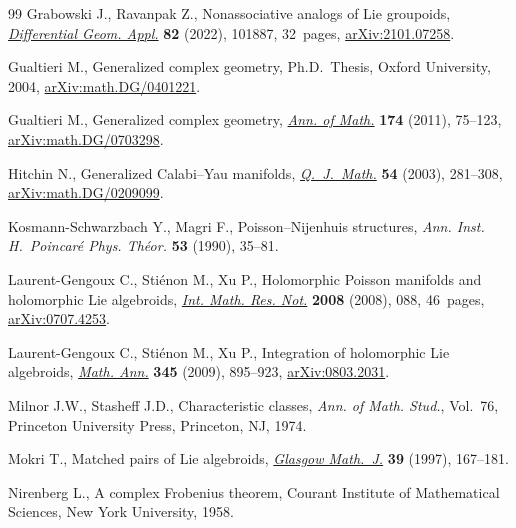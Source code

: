 \documentclass[pdftex]{sigma}
\numberwithin{equation}{section}
\begin{document}
\begin{thebibliography}{99}
Grabowski J., Ravanpak Z., Nonassociative analogs of {L}ie groupoids,
 \href{https://doi.org/10.1016/j.difgeo.2022.101887}{\textit{Differential
 Geom. Appl.}} \textbf{82} (2022), 101887, 32~pages,
 \href{http://arxiv.org/abs/2101.07258}{arXiv:2101.07258}.

Gualtieri M., Generalized complex geometry, Ph.D.~Thesis, {O}xford University,
 2004, \href{http://arxiv.org/abs/math.DG/0401221}{arXiv:math.DG/0401221}.

Gualtieri M., Generalized complex geometry,
 \href{https://doi.org/10.4007/annals.2011.174.1.3}{\textit{Ann. of Math.}}
 \textbf{174} (2011), 75--123,
 \href{http://arxiv.org/abs/math.DG/0703298}{arXiv:math.DG/0703298}.

Hitchin N., Generalized {C}alabi--{Y}au manifolds,
 \href{https://doi.org/10.1093/qjmath/54.3.281}{\textit{Q.~J.~Math.}}
 \textbf{54} (2003), 281--308,
 \href{http://arxiv.org/abs/math.DG/0209099}{arXiv:math.DG/0209099}.

Kosmann-Schwarzbach Y., Magri F., Poisson--{N}ijenhuis structures, \textit{Ann.
 Inst. H.~Poincar\'e Phys. Th\'eor.} \textbf{53} (1990), 35--81.

Laurent-Gengoux C., Sti\'enon M., Xu P., Holomorphic {P}oisson manifolds and
 holomorphic {L}ie algebroids,
 \href{https://doi.org/10.1093/imrn/rnn088}{\textit{Int. Math. Res. Not.}}
 \textbf{2008} (2008), 088, 46~pages,
 \href{http://arxiv.org/abs/0707.4253}{arXiv:0707.4253}.

Laurent-Gengoux C., Sti\'enon M., Xu P., Integration of holomorphic {L}ie
 algebroids, \href{https://doi.org/10.1007/s00208-009-0388-7}{\textit{Math.
 Ann.}} \textbf{345} (2009), 895--923,
 \href{http://arxiv.org/abs/0803.2031}{arXiv:0803.2031}.

Milnor J.W., Stasheff J.D., Characteristic classes, \textit{Ann. of Math.
 Stud.}, Vol.~76, Princeton University Press, Princeton, NJ, 1974.

Mokri T., Matched pairs of {L}ie algebroids,
 \href{https://doi.org/10.1017/S0017089500032055}{\textit{Glasgow Math.~J.}}
 \textbf{39} (1997), 167--181.

Nirenberg L., A complex Frobenius theorem, Courant Institute of Mathematical
 Sciences, New York University, 1958.


\end{thebibliography}
\end{document}
